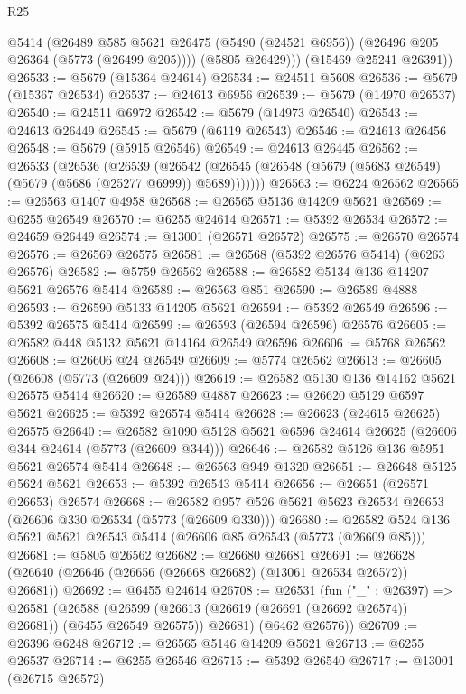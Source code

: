 \begin{lexlean}{R25}
\begin{coremodule}
          @5414
          (@26489
            @585
            @5621
            @26475
            (@5490 (@24521 @6956))
            (@26496 @205 @26364 (@5773 (@26499 @205))))
          (@5805 @26429)))
      (@15469 @25241 @26391))
@26533 := @5679 (@15364 @24614)
@26534 := @24511 @5608
@26536 := @5679 (@15367 @26534)
@26537 := @24613 @6956
@26539 := @5679 (@14970 @26537)
@26540 := @24511 @6972
@26542 := @5679 (@14973 @26540)
@26543 := @24613 @26449
@26545 := @5679 (@6119 @26543)
@26546 := @24613 @26456
@26548 := @5679 (@5915 @26546)
@26549 := @24613 @26445
@26562 := @26533
    (@26536
      (@26539
        (@26542 (@26545 (@26548 (@5679 (@5683 @26549) (@5679 (@5686 (@25277 @6999)) @5689)))))))
@26563 := @6224 @26562
@26565 := @26563 @1407 @4958
@26568 := @26565 @5136 @14209 @5621
@26569 := @6255 @26549
@26570 := @6255 @24614
@26571 := @5392 @26534
@26572 := @24659 @26449
@26574 := @13001 (@26571 @26572)
@26575 := @26570 @26574
@26576 := @26569 @26575
@26581 := @26568 (@5392 @26576 @5414) (@6263 @26576)
@26582 := @5759 @26562
@26588 := @26582 @5134 @136 @14207 @5621 @26576 @5414
@26589 := @26563 @851
@26590 := @26589 @4888
@26593 := @26590 @5133 @14205 @5621
@26594 := @5392 @26549
@26596 := @5392 @26575 @5414
@26599 := @26593 (@26594 @26596) @26576
@26605 := @26582 @448 @5132 @5621 @14164 @26549 @26596
@26606 := @5768 @26562
@26608 := @26606 @24 @26549
@26609 := @5774 @26562
@26613 := @26605 (@26608 (@5773 (@26609 @24)))
@26619 := @26582 @5130 @136 @14162 @5621 @26575 @5414
@26620 := @26589 @4887
@26623 := @26620 @5129 @6597 @5621
@26625 := @5392 @26574 @5414
@26628 := @26623 (@24615 @26625) @26575
@26640 := @26582 @1090 @5128 @5621 @6596 @24614 @26625 (@26606 @344 @24614 (@5773 (@26609 @344)))
@26646 := @26582 @5126 @136 @5951 @5621 @26574 @5414
@26648 := @26563 @949 @1320
@26651 := @26648 @5125 @5624 @5621
@26653 := @5392 @26543 @5414
@26656 := @26651 (@26571 @26653) @26574
@26668 := @26582 @957 @526 @5621 @5623 @26534 @26653 (@26606 @330 @26534 (@5773 (@26609 @330)))
@26680 := @26582 @524 @136 @5621 @5621 @26543 @5414 (@26606 @85 @26543 (@5773 (@26609 @85)))
@26681 := @5805 @26562
@26682 := @26680 @26681
@26691 := @26628 (@26640 (@26646 (@26656 (@26668 @26682) (@13061 @26534 @26572)) @26681))
@26692 := @6455 @24614
@26708 := @26531
    (fun ("_" : @26397) =>
    @26581
      (@26588
        (@26599 (@26613 (@26619 (@26691 (@26692 @26574)) @26681)) (@6455 @26549 @26575))
        @26681)
      (@6462 @26576))
@26709 := @26396 @6248
@26712 := @26565 @5146 @14209 @5621
@26713 := @6255 @26537
@26714 := @6255 @26546
@26715 := @5392 @26540
@26717 := @13001 (@26715 @26572)

\end{coremodule}
\end{lexlean}
